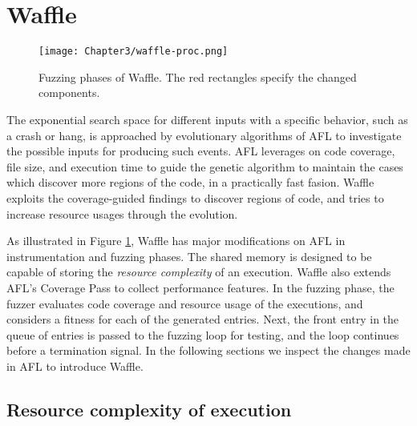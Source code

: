 \section{Waffle}
\label{sec:3-instr}



\begin{figure}[!t]
  \texttt{[image: Chapter3/waffle-proc.png]}
  \centering
  \caption{Fuzzing phases of Waffle. The red rectangles specify the changed components.}
  \label{fig:waffle-phases}
\end{figure}

The exponential search space for different inputs with a specific behavior, such as a crash or hang, is approached by evolutionary algorithms of AFL to investigate the possible inputs for producing such events. AFL leverages on code coverage, file size, and execution time to guide the genetic algorithm to maintain the cases which discover more regions of the code, in a practically fast fasion. Waffle exploits the coverage-guided findings to discover regions of code, and tries to increase resource usages through the evolution.


As illustrated in Figure \ref{fig:waffle-phases}, Waffle has major modifications on AFL in instrumentation and fuzzing phases. The shared memory is designed to be capable of storing the \textit{resource complexity} of an execution. Waffle also extends AFL's Coverage Pass to collect performance features. In the fuzzing phase, the fuzzer evaluates code coverage and resource usage of the executions, and considers a fitness for each of the generated entries. Next, the front entry in the queue of entries is passed to the fuzzing loop for testing, and the loop continues before a termination signal. In the following sections we inspect the changes made in AFL to introduce Waffle.

\subsection{Resource complexity of execution}

